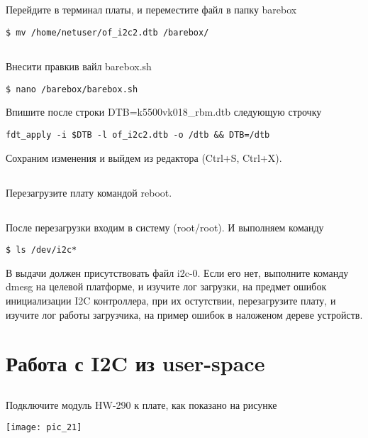 \subsection{}Перейдите в терминал платы, и переместите файл в папку barebox
\begin{lstlisting}[style=bash]
$ mv /home/netuser/of_i2c2.dtb /barebox/
\end{lstlisting}

\subsection{}Внесити правкив вайл barebox.sh
\begin{lstlisting}[style=bash]
$ nano /barebox/barebox.sh
\end{lstlisting}
Впишите после строки DTB=k5500vk018\_rbm.dtb следующую строчку
\begin{lstlisting}[style=stdout]
fdt_apply -i $DTB -l of_i2c2.dtb -o /dtb && DTB=/dtb
\end{lstlisting}
Сохраним изменения и выйдем из редактора (Ctrl+S, Ctrl+X).

\subsection{}Перезагрузите плату командой reboot.

\subsection{}После перезагрузки входим в систему (root/root). И выполняем команду
\begin{lstlisting}[style=bash]
$ ls /dev/i2c*
\end{lstlisting} 

В выдачи должен присутствовать файл i2c-0. Если его нет, выполните команду dmesg на целевой платформе, и изучите лог загрузки, на предмет ошибок инициализации I2C контроллера, при их остутствии, перезагрузите плату, и изучите лог работы загрузчика, на пример ошибок в наложеном дереве устройств.

\section{Работа с I2C из user-space}

\subsection{}Подключите модуль HW-290 к плате, как показано на рисунке 
\begin{center}
	\texttt{[image: pic\_21]}
\end{center}

